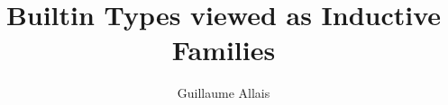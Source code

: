 \documentclass{article}
\begin{document}
\title{Builtin Types viewed as Inductive Families
}
\author{Guillaume Allais}

\maketitle

\toggletrue{APPENDIX}
\togglefalse{BLIND}

\begin{abstract}
  
\end{abstract}












\iftoggle{APPENDIX}{
\appendix



}{}
\end{document}

